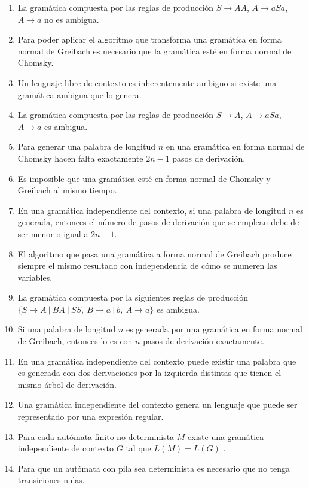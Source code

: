 \begin{enumerate}
    \item La gramática compuesta por las reglas de producción $S\rightarrow AA$, $A\rightarrow aSa$, $A\rightarrow a$ no es ambigua.
    \item Para poder aplicar el algoritmo que transforma una gramática en forma normal de Greibach es necesario que la gramática esté en forma normal de Chomsky.
    \item Un lenguaje libre de contexto es inherentemente ambiguo si existe una gramática ambigua que lo genera.
    \item La gramática compuesta por las reglas de producción $S\rightarrow A$, $A\rightarrow aSa$, $A\rightarrow a$ es ambigua.
    \item Para generar una palabra de longitud $n$ en una gramática en forma normal de Chomsky hacen falta exactamente $2n-1$ pasos de derivación.
    \item Es imposible que una gramática esté en forma normal de Chomsky y Greibach al mismo tiempo.
    \item En una gramática independiente del contexto, si una palabra de longitud $n$ es generada, entonces el número de pasos de derivación que se emplean debe de ser menor o igual a $2n-1$.
    \item El algoritmo que pasa una gramática a forma normal de Greibach produce siempre el mismo resultado con independencia de cómo se numeren las variables.
    \item La gramática compuesta por la siguientes reglas de producción \newline $\{S\rightarrow A\ |\ BA\ |\ SS,\ B\rightarrow a\ |\ b,\ A\rightarrow a\}$ es ambigua.
    \item Si una palabra de longitud $n$ es generada por una gramática en forma normal de Greibach, entonces lo es con $n$ pasos de derivación exactamente.
    \item En una gramática independiente del contexto puede existir una palabra que es generada con dos derivaciones por la izquierda distintas que tienen el mismo árbol de derivación.
    \item Una gramática independiente del contexto genera un lenguaje que puede ser representado por una expresión regular.
    \item Para cada autómata finito no determinista $M$ existe una gramática independiente de contexto $G$ tal que $L(M) = L(G)$ .
    \item Para que un autómata con pila sea determinista es necesario que no tenga transiciones nulas.

\end{enumerate}
